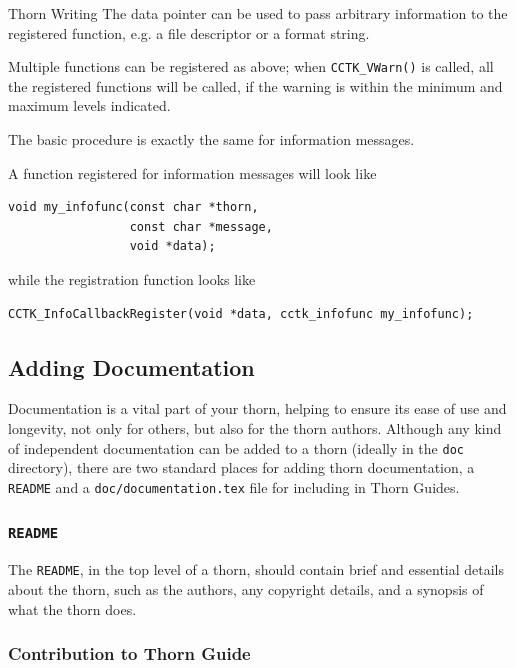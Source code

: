 \begin{cactuspart}{Thorn Writing}
The data pointer can be used to pass arbitrary information to the
registered function, e.g. a file descriptor or a format string.

Multiple functions can be registered as above; when
\texttt{CCTK\_VWarn()} is called, all the registered functions will be
called, if the warning is within the minimum and maximum levels
indicated.

The basic procedure is exactly the same for information messages.

A function registered for information messages will look like
\begin{verbatim}
void my_infofunc(const char *thorn,
                 const char *message,
                 void *data);
\end{verbatim}
while the registration function looks like 
\begin{verbatim}
CCTK_InfoCallbackRegister(void *data, cctk_infofunc my_infofunc);
\end{verbatim}


\subsection{Adding Documentation}
\label{sec:Adding_documentation}

Documentation is a vital part of your thorn, helping to ensure its
ease of use and longevity, not only for others, but also for the thorn
authors.  Although any kind of independent documentation can be added
to a thorn (ideally in the \texttt{doc} directory), there are two
standard places for adding thorn documentation, a \texttt{README} and a
\texttt{doc/documentation.tex} file for including in Thorn Guides.

\subsubsection{\texttt{README}}

The \texttt{README}, in the top level of a thorn, should contain brief
and essential details about the thorn, such as the authors, any
copyright details, and a synopsis of what the thorn does.

\subsubsection{Contribution to Thorn Guide}


\end{cactuspart}
